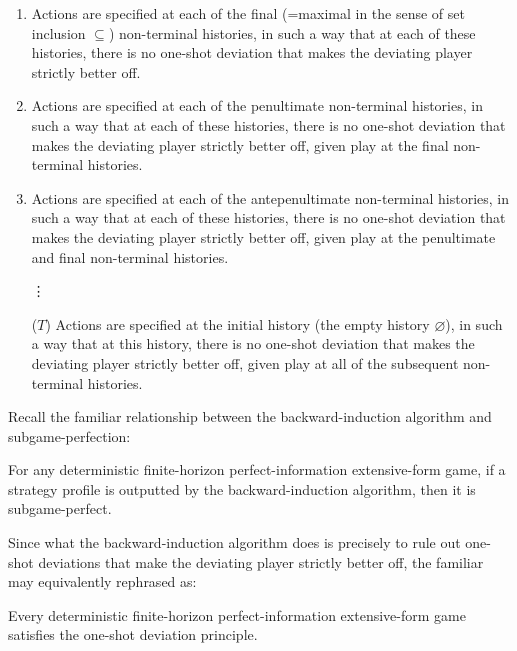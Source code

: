 \begin{enumerate}

	\item \label{item:backward_induction:1} Actions are specified at each of the final (=maximal in the sense of set inclusion $\subseteq$) non-terminal histories, in such a way that at each of these histories, there is no one-shot deviation that makes the deviating player strictly better off.

	\item \label{item:backward_induction:2} Actions are specified at each of the penultimate non-terminal histories, in such a way that at each of these histories, there is no one-shot deviation that makes the deviating player strictly better off, given play at the final non-terminal histories.

	\item \label{item:backward_induction:3} Actions are specified at each of the antepenultimate non-terminal histories, in such a way that at each of these histories, there is no one-shot deviation that makes the deviating player strictly better off, given play at the penultimate and final non-terminal histories.

	\item[\vdots]

	\item[($T$)] Actions are specified at the initial history (the empty history $\varnothing$), in such a way that at this history, there is no one-shot deviation that makes the deviating player strictly better off, given play at all of the subsequent non-terminal histories.

\end{enumerate}

Recall the familiar relationship between the backward-induction algorithm and subgame-perfection:

\begin{fact}
	\label{fact:bi_spne}
	For any deterministic finite-horizon perfect-information extensive-form game, if a strategy profile is outputted by the backward-induction algorithm, then it is subgame-perfect.
\end{fact}

Since what the backward-induction algorithm does is precisely to rule out one-shot deviations that make the deviating player strictly better off, the familiar  may equivalently rephrased as:

\begin{proposition}
	\label{proposition:osdp_finite}
	Every deterministic finite-horizon perfect-information exten\-sive-form game satisfies the one-shot deviation principle.
\end{proposition}

